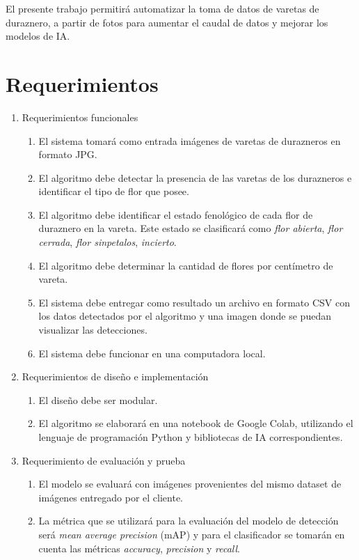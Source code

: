 El presente trabajo permitirá automatizar la toma de datos de varetas de duraznero, a partir de fotos para aumentar el caudal de datos y mejorar los modelos de IA.

\section{Requerimientos}

\begin{enumerate}
	\item Requerimientos funcionales
		\begin{enumerate}
			\item El sistema tomará como entrada imágenes de varetas de durazneros en formato JPG.			
			\item El algoritmo debe detectar la presencia de las varetas de los durazneros e identificar el tipo de flor que posee.			        
			\item El algoritmo debe identificar el estado fenológico de cada flor de duraznero en la vareta. Este estado se clasificará como  \textit{flor abierta}, \textit{flor cerrada}, \textit{flor sinpetalos}, \textit{incierto}.
			\item El algoritmo debe determinar la cantidad de flores por centímetro de vareta.
			\item El sistema debe entregar como resultado un archivo en formato CSV con los datos detectados por el algoritmo y una imagen donde se puedan visualizar las detecciones.
			\item El sistema debe funcionar en una computadora local.
		\end{enumerate}
	\item Requerimientos de diseño e implementación
		\begin{enumerate}
			\item El diseño debe ser modular.
			\item El algoritmo se elaborará en una notebook de Google Colab, utilizando el lenguaje de  programación Python y bibliotecas de IA correspondientes. 
		\end{enumerate}
	\item Requerimiento de evaluación y prueba
	\begin{enumerate}
			\item El modelo se evaluará con imágenes provenientes del mismo dataset de imágenes entregado por el cliente.
			 \item La métrica que se utilizará para la evaluación del modelo de detección será \textit{mean average precision} (mAP) y para el clasificador se tomarán en cuenta las métricas \textit{accuracy}, \textit{precision} y \textit{recall}.

\end{enumerate}
\end{enumerate}
